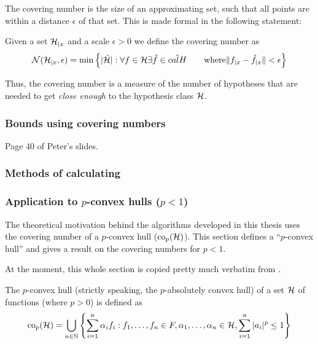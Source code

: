 The covering number is the size of an approximating set, such that all
points are within a distance $\epsilon$ of that set.  This is made
formal in the following statement:

\begin{definition}

Given a set $\mathcal{H}_{|x}$ and a scale $\epsilon > 0$ we define the
covering number as
%
\begin{equation}
\mathcal{N}({\mathcal{H}_{|x}}, {\epsilon}) = \min \left\{
|\hat{\mathcal{H}}| : \forall f \in \mathcal{H} \exists \hat{f} \in \hat{calH}
 \qquad \mbox{where} \| f_{|x} - \hat{f}_{|x} \| < \epsilon \right\}
\end{equation}
\end{definition}

Thus, the covering number is a measure of the number of hypotheses
that are needed to get \emph{close enough} to the hypothesis class
$\mathcal{H}$.


\subsubsection{Bounds using covering numbers}

Page 40 of Peter's slides.

\subsubsection{Methods of calculating}

\subsubsection{Application to $p$-convex hulls ($p < 1$)}

The theoretical motivation behind the algorithms developed in this
thesis uses the covering number of a $p$-convex hull ($\mathrm{co}_p(\mathcal{H})$).
This section defines a ``$p$-convex hull'' and gives a result on the covering
numbers for $p < 1$.  

At the moment, this whole section is copied pretty much verbatim from
\cite{Williamson99}.

The $p$-convex hull (strictly speaking, the $p$-absolutely convex hull) of
a set $\mathcal{H}$ of functions (where $p>0$) is defined as
%
\begin{equation}
\mathrm{co}_p (\mathcal{H}) =
 \bigcup _{n \in \mathbb{N}}
\left\{
 \sum_{i=1}^{n}
 \alpha _i
f_i : f_1, \ldots, f_n \in F,
 \alpha _1, \ldots, \alpha _n \in \mathbb{\mathcal{H}},
 \sum_{i=1}^{n} | a_i |^p \leq 1
\right\}
\end{equation}

